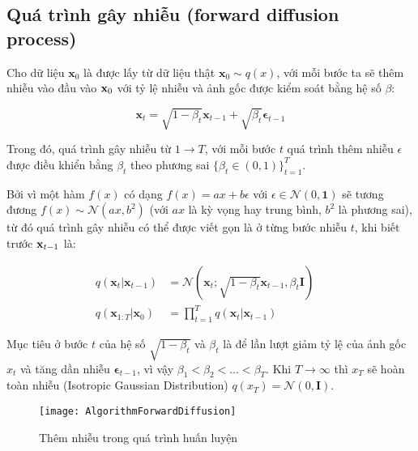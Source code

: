 \subsection{Quá trình gây nhiễu (forward diffusion process)}

Cho dữ liệu $\mathbf{x}_{0}$ là được lấy từ dữ liệu thật $\mathbf{x}_{0} \sim q(x)$, với mỗi bước ta sẽ thêm nhiễu vào đầu vào $\mathbf{x}_{0}$ với tỷ lệ nhiễu và ảnh gốc được kiểm soát bằng hệ số $\beta$:


\begin{equation}
	\label{eq:addgaussian}
	\mathbf{x}_t = \sqrt{1 - \beta_t}\mathbf{x}_{t-1} + \sqrt{\beta_t} \boldsymbol{\epsilon}_{t-1}
\end{equation}


Trong đó, quá trình gây nhiễu từ $1 \to T$, với mỗi bước $t$ quá trình thêm nhiễu $\epsilon$ được điều khiển bằng $\beta_t$ theo phương sai $\{\beta_t \in (0, 1)\}_{t=1}^T$.

Bởi vì một hàm $f(x)$ có dạng $f(x) = a x + b\epsilon$ với $\epsilon \in \mathcal{N}(0, \mathbf{1})$ sẽ tương đương $f(x) \sim \mathcal{N}(a x, b^2)$ (với $a x$ là kỳ vọng hay trung bình, $b^2$ là phương sai), từ đó quá trình gây nhiễu có thể được viết gọn là ở từng bước nhiễu $t$, khi biết trước $\mathbf{x}_{t-1}$ là:

\begin{equation}
	\label{eq:forward_diffusion_process}
	\begin{aligned}
		q(\mathbf{x}_t \vert \mathbf{x}_{t-1}) &= \mathcal{N}(\mathbf{x}_t; \sqrt{1 - \beta_t} \mathbf{x}_{t-1}, \beta_t\mathbf{I}) \quad \\
		q(\mathbf{x}_{1:T} \vert \mathbf{x}_0) &= \prod^T_{t=1} q(\mathbf{x}_t \vert \mathbf{x}_{t-1})
	\end{aligned}
\end{equation}

Mục tiêu ở bước $t$ của hệ số $\sqrt{1 - \beta_t}$ và $\beta_t$ là để lần lượt giảm tỷ lệ của ảnh gốc $x_t$ và tăng dần nhiễu  $\boldsymbol{\epsilon}_{t-1}$, vì vậy $\beta_1 < \beta_2 < \dots < \beta_T$. Khi $T \to \infty$ thì $x_{T}$ sẽ hoàn toàn nhiễu \cite{weng2021diffusion} (Isotropic Gaussian Distribution) $q(x_{T}) = \mathcal{N} (0, \mathbf{I})$.

\begin{figure}[H]
	\centering
	\texttt{[image: AlgorithmForwardDiffusion]}
	\caption{Thêm nhiễu trong quá trình huấn luyện}
	\label{fig:AlgorithmForwardDiffusion}
\end{figure}

